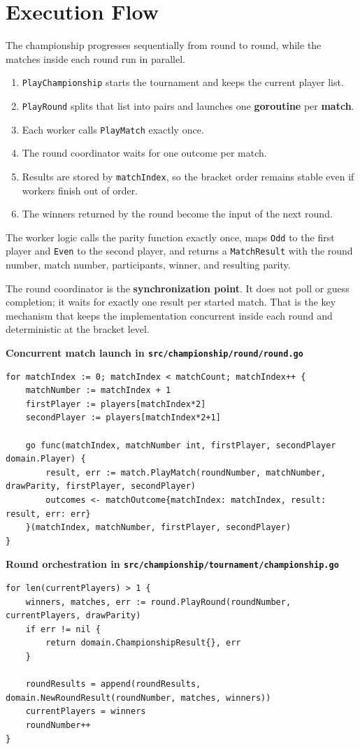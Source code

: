 \section{Execution Flow}

The championship progresses sequentially from round to round, while the matches inside each round run in parallel.

\begin{enumerate}
    \item \texttt{PlayChampionship} starts the tournament and keeps the current player list.
    \item \texttt{PlayRound} splits that list into pairs and launches one \textbf{goroutine} per \textbf{match}.
    \item Each worker calls \texttt{PlayMatch} exactly once.
    \item The round coordinator waits for one outcome per match.
    \item Results are stored by \texttt{matchIndex}, so the bracket order remains stable even if workers finish out of order.
    \item The winners returned by the round become the input of the next round.
\end{enumerate}

The worker logic calls the parity function exactly once, maps \texttt{Odd} to the first player and \texttt{Even} to the
second player, and returns a
\texttt{MatchResult} with the round number, match number, participants, winner, and resulting parity.

The round coordinator is the \textbf{synchronization point}.
It does not poll or guess completion; it waits for exactly one result per started match.
That is the key mechanism that keeps the implementation concurrent inside each round and deterministic at the bracket level.

\medskip

\noindent\textbf{Concurrent match launch in \texttt{src/championship/round/round.go}}
\begin{lstlisting}[style=reportcode]
for matchIndex := 0; matchIndex < matchCount; matchIndex++ {
    matchNumber := matchIndex + 1
    firstPlayer := players[matchIndex*2]
    secondPlayer := players[matchIndex*2+1]

    go func(matchIndex, matchNumber int, firstPlayer, secondPlayer domain.Player) {
        result, err := match.PlayMatch(roundNumber, matchNumber, drawParity, firstPlayer, secondPlayer)
        outcomes <- matchOutcome{matchIndex: matchIndex, result: result, err: err}
    }(matchIndex, matchNumber, firstPlayer, secondPlayer)
}
\end{lstlisting}

\noindent\textbf{Round orchestration in \texttt{src/championship/tournament/championship.go}}
\begin{lstlisting}[style=reportcode]
for len(currentPlayers) > 1 {
    winners, matches, err := round.PlayRound(roundNumber, currentPlayers, drawParity)
    if err != nil {
        return domain.ChampionshipResult{}, err
    }

    roundResults = append(roundResults, domain.NewRoundResult(roundNumber, matches, winners))
    currentPlayers = winners
    roundNumber++
}
\end{lstlisting}

